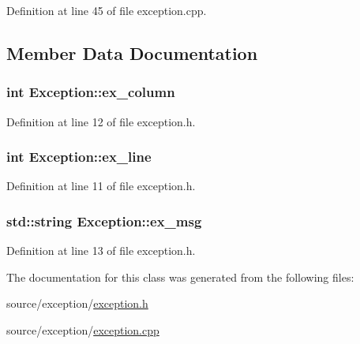 Definition at line 45 of file exception.cpp.



\subsection{Member Data Documentation}
\hypertarget{class_exception_a5a08b0f7c24a639573c36ace567348c4}{
\subsubsection[{ex\_\-column}]{\setlength{\rightskip}{0pt plus 5cm}int {\bf Exception::ex\_\-column}}}
\label{class_exception_a5a08b0f7c24a639573c36ace567348c4}


Definition at line 12 of file exception.h.

\hypertarget{class_exception_ab30bf54ebcf9ead45300ce422fb4b6b8}{
\subsubsection[{ex\_\-line}]{\setlength{\rightskip}{0pt plus 5cm}int {\bf Exception::ex\_\-line}}}
\label{class_exception_ab30bf54ebcf9ead45300ce422fb4b6b8}


Definition at line 11 of file exception.h.

\hypertarget{class_exception_ac106ae3b8d10ae97ee0b71a270fbda27}{
\subsubsection[{ex\_\-msg}]{\setlength{\rightskip}{0pt plus 5cm}std::string {\bf Exception::ex\_\-msg}}}
\label{class_exception_ac106ae3b8d10ae97ee0b71a270fbda27}


Definition at line 13 of file exception.h.



The documentation for this class was generated from the following files:\begin{DoxyCompactItemize}
\item 
source/exception/\hyperlink{exception_8h}{exception.h}\item 
source/exception/\hyperlink{exception_8cpp}{exception.cpp}\end{DoxyCompactItemize}
